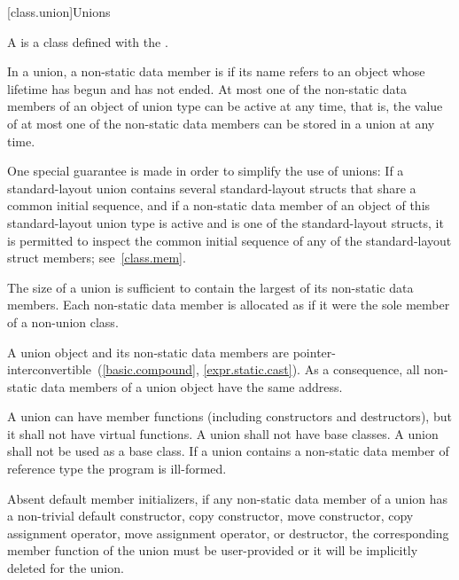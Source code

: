 [class.union]{Unions}%

\pnum
A  is a class defined with the 
.

\pnum
In a union,
a non-static data member is 
if its name refers to an object
whose lifetime has begun and has not ended.
At most one of the non-static data members of an object of union type
can be active at any
time, that is, the value of at most one of the non-static data members can be
stored in a union at any time.
\begin{note}
One special guarantee is made in order to
simplify the use of unions: If a standard-layout union contains several standard-layout
structs that share a common initial sequence, and
if a non-static data member of an object of this standard-layout union type
is active and is one of the standard-layout structs,
it is permitted to inspect the common initial sequence
of any of the standard-layout struct members;
see~\ref{class.mem}.
\end{note}

\pnum
The size of a union is sufficient to contain the largest
of its non-static data members. Each non-static data member is allocated
as if it were the sole member of a non-union class.
\begin{note}
A union object and its non-static data members are
pointer-interconvertible~(\ref{basic.compound}, \ref{expr.static.cast}).
As a consequence, all non-static data members of a
union object have the same address.
\end{note}

\pnum
{}%
%
%
A union can have member functions (including constructors and destructors),
%
but it shall not have virtual functions. A union shall not have
base classes. A union shall not be used as a base class.
%
If a union contains a non-static data member of
reference type the program is ill-formed.
\begin{note}
Absent default member initializers,
if any non-static data member of a union has a non-trivial
default constructor,
copy constructor, move constructor,
copy assignment operator, move assignment operator,
or destructor, the corresponding member function
of the union must be user-provided or it will
be implicitly deleted for the union.
\end{note}

